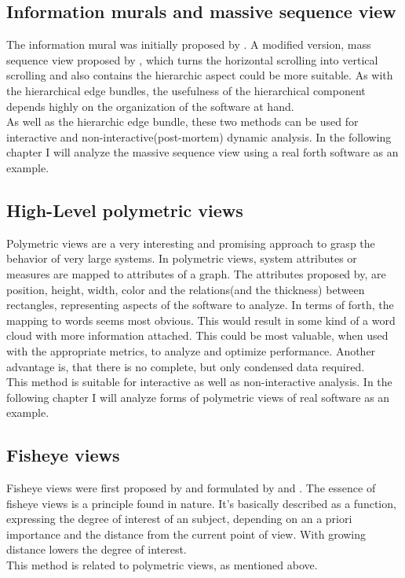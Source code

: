 \subsection*{Information murals and massive sequence view}
The information mural was initially proposed by \cite{Jerding:1998:IMT:614271.614408}. A modified version, mass sequence view proposed by \cite{Cornelissen2009}, which turns the horizontal scrolling into vertical scrolling and also contains the hierarchic aspect could be more suitable. As with the hierarchical edge bundles, the usefulness of the hierarchical component depends highly on the organization of the software at hand.
\\
As well as the hierarchic edge bundle, these two methods can be used for interactive and non-interactive(post-mortem) dynamic analysis. In the following chapter I will analyze the massive sequence view using a real forth software as an example.

\subsection*{High-Level polymetric views}
Polymetric views\cite{Ducasse:2004:HPV:977397.977739} are a very interesting and promising approach to grasp the behavior of very large systems. In polymetric views, system attributes or measures are mapped to attributes of a graph. The attributes proposed by\cite{Ducasse:2004:HPV:977397.977739}, are position, height, width, color and the relations(and the thickness) between rectangles, representing aspects of the software to analyze. In terms of forth, the mapping to words seems most obvious. This would result in some kind of a word cloud with more information attached. This could be most valuable, when used with the appropriate metrics, to analyze and optimize performance. Another advantage is, that there is no complete, but only condensed data required.
\\
This method is suitable for interactive as well as non-interactive analysis. In the following chapter I will analyze forms of polymetric views of real software as an example.

\subsection*{Fisheye views}
Fisheye views were first proposed by \cite{Furnas:1986:GFV:22627.22342} and formulated by \cite{Storey:1995:GLA:647547.728600} and \cite{Sarkar:1994:GFV:198366.198384}. The essence of fisheye views is a principle found in nature. It's basically described as a function, expressing the degree of interest of an subject, depending on an a priori importance and the distance from the current point of view. With growing distance lowers the degree of interest.
\\
This method is related to polymetric views, as mentioned above.

